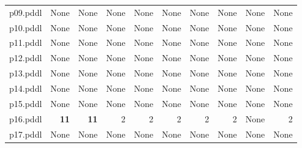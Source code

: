 \documentclass{article}
\begin{document}
\begin{tabular}{@{}lrrrrrrrrr@{}}
p09.pddl & \multicolumn{1}{|l|}{None} & \multicolumn{1}{|l|}{None} & \multicolumn{1}{|l|}{None} & \multicolumn{1}{|l|}{None} & \multicolumn{1}{|l|}{None} & \multicolumn{1}{|l|}{None} & \multicolumn{1}{|l|}{None} & \multicolumn{1}{|l|}{None} & \multicolumn{1}{|l|}{None} \\
p10.pddl & \multicolumn{1}{|l|}{None} & \multicolumn{1}{|l|}{None} & \multicolumn{1}{|l|}{None} & \multicolumn{1}{|l|}{None} & \multicolumn{1}{|l|}{None} & \multicolumn{1}{|l|}{None} & \multicolumn{1}{|l|}{None} & \multicolumn{1}{|l|}{None} & \multicolumn{1}{|l|}{None} \\
p11.pddl & \multicolumn{1}{|l|}{None} & \multicolumn{1}{|l|}{None} & \multicolumn{1}{|l|}{None} & \multicolumn{1}{|l|}{None} & \multicolumn{1}{|l|}{None} & \multicolumn{1}{|l|}{None} & \multicolumn{1}{|l|}{None} & \multicolumn{1}{|l|}{None} & \multicolumn{1}{|l|}{None} \\
p12.pddl & \multicolumn{1}{|l|}{None} & \multicolumn{1}{|l|}{None} & \multicolumn{1}{|l|}{None} & \multicolumn{1}{|l|}{None} & \multicolumn{1}{|l|}{None} & \multicolumn{1}{|l|}{None} & \multicolumn{1}{|l|}{None} & \multicolumn{1}{|l|}{None} & \multicolumn{1}{|l|}{None} \\
p13.pddl & \multicolumn{1}{|l|}{None} & \multicolumn{1}{|l|}{None} & \multicolumn{1}{|l|}{None} & \multicolumn{1}{|l|}{None} & \multicolumn{1}{|l|}{None} & \multicolumn{1}{|l|}{None} & \multicolumn{1}{|l|}{None} & \multicolumn{1}{|l|}{None} & \multicolumn{1}{|l|}{None} \\
p14.pddl & \multicolumn{1}{|l|}{None} & \multicolumn{1}{|l|}{None} & \multicolumn{1}{|l|}{None} & \multicolumn{1}{|l|}{None} & \multicolumn{1}{|l|}{None} & \multicolumn{1}{|l|}{None} & \multicolumn{1}{|l|}{None} & \multicolumn{1}{|l|}{None} & \multicolumn{1}{|l|}{None} \\
p15.pddl & \multicolumn{1}{|l|}{None} & \multicolumn{1}{|l|}{None} & \multicolumn{1}{|l|}{None} & \multicolumn{1}{|l|}{None} & \multicolumn{1}{|l|}{None} & \multicolumn{1}{|l|}{None} & \multicolumn{1}{|l|}{None} & \multicolumn{1}{|l|}{None} & \multicolumn{1}{|l|}{None} \\
p16.pddl & \textbf{11} & \textbf{11} & 2 & 2 & 2 & 2 & 2 & \multicolumn{1}{|l|}{None} & 2 \\
p17.pddl & \multicolumn{1}{|l|}{None} & \multicolumn{1}{|l|}{None} & \multicolumn{1}{|l|}{None} & \multicolumn{1}{|l|}{None} & \multicolumn{1}{|l|}{None} & \multicolumn{1}{|l|}{None} & \multicolumn{1}{|l|}{None} & \multicolumn{1}{|l|}{None} & \multicolumn{1}{|l|}{None} \\

\end{tabular}
\end{document}
